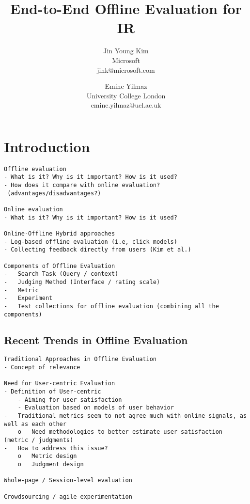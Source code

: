 \documentclass[openany]{now} %
\title{End-to-End Offline Evaluation for IR}
\author{
Jin Young Kim \\
Microsoft \\
jink@microsoft.com
\and
Emine Yilmaz \\
University College London \\
emine.yilmaz@ucl.ac.uk
}
\begin{document}

\frontmatter  %

\maketitle

\tableofcontents

\mainmatter

\begin{abstract}

\end{abstract}

\chapter{Introduction}
\label{c-intro} %

\begin{verbatim}
Offline evaluation
- What is it? Why is it important? How is it used?
- How does it compare with online evaluation?
 (advantages/disadvantages?)

Online evaluation
- What is it? Why is it important? How is it used?

Online-Offline Hybrid approaches
- Log-based offline evaluation (i.e, click models)
- Collecting feedback directly from users (Kim et al.)

Components of Offline Evaluation
-	Search Task (Query / context)
-	Judging Method (Interface / rating scale) 
-	Metric
-	Experiment
-	Test collections for offline evaluation (combining all the components)
\end{verbatim}

\cite{INR-009}

\section{Recent Trends in Offline Evaluation}

\begin{verbatim}
Traditional Approaches in Offline Evaluation
- Concept of relevance 

Need for User-centric Evaluation
- Definition of User-centric
	- Aiming for user satisfaction
	- Evaluation based on models of user behavior
-	Traditional metrics seem to not agree much with online signals, as well as each other
	o	Need methodologies to better estimate user satisfaction (metric / judgments)
-	How to address this issue?
	o	Metric design
	o	Judgment design

Whole-page / Session-level evaluation

Crowdsourcing / agile experimentation

\end{verbatim}
\end{document}
